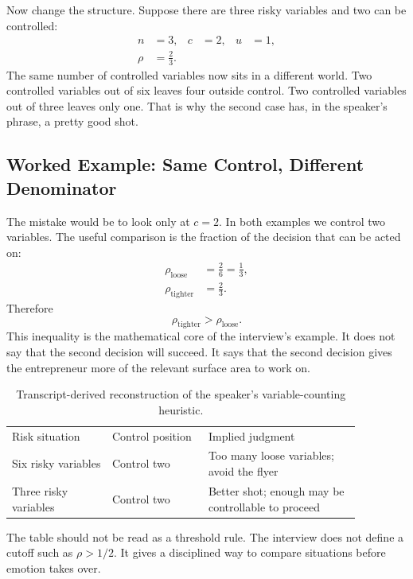 Now change the structure. Suppose there are three risky variables and two can be controlled:
\begin{align}
n&=3, & c&=2, & u&=1,\\
\rho&=\frac{2}{3}.
\end{align}
The same number of controlled variables now sits in a different world. Two controlled variables out of six leaves four outside control. Two controlled variables out of three leaves only one. That is why the second case has, in the speaker's phrase, a pretty good shot.

\subsection{Worked Example: Same Control, Different Denominator}

The mistake would be to look only at \(c=2\). In both examples we control two variables. The useful comparison is the fraction of the decision that can be acted on:
\begin{align}
\rho_{\mathrm{loose}} &= \frac{2}{6}=\frac{1}{3},\\
\rho_{\mathrm{tighter}} &= \frac{2}{3}.
\end{align}
Therefore
\begin{equation}
\rho_{\mathrm{tighter}}>\rho_{\mathrm{loose}}.
\end{equation}
This inequality is the mathematical core of the interview's example. It does not say that the second decision will succeed. It says that the second decision gives the entrepreneur more of the relevant surface area to work on.

\begin{table}
\centering
\begin{tabular}{p{0.25\linewidth} p{0.24\linewidth} p{0.38\linewidth}}
Risk situation & Control position & Implied judgment \\
Six risky variables & Control two & Too many loose variables; avoid the flyer \\
Three risky variables & Control two & Better shot; enough may be controllable to proceed \\
\end{tabular}
\caption{Transcript-derived reconstruction of the speaker's variable-counting heuristic.}
\end{table}

The table should not be read as a threshold rule. The interview does not define a cutoff such as \(\rho>1/2\). It gives a disciplined way to compare situations before emotion takes over.

